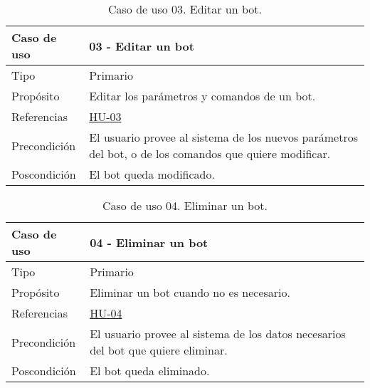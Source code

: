 \begin{table}[H]
    \centering
    \def\arraystretch{1.25}
    \begin{adjustbox}{max width=\textwidth}
    \begin{tabularx}{\textwidth}{|l|L|}
    \hline
        \textbf{Caso de uso} & \textbf{03 - Editar un bot} \\ \hline
    \hline
        Tipo & Primario \\ \hline
        Propósito & Editar los parámetros y comandos de un bot. \\ \hline
        Referencias & \hyperref[sec:hu03]{HU-03}\\ \hline
        Precondición & El usuario provee al sistema de los nuevos parámetros del bot, o de los comandos que quiere modificar. \\ \hline
        Poscondición & El bot queda modificado. \\ \hline
    \end{tabularx}
    \end{adjustbox}
    \caption{Caso de uso 03. Editar un bot.}
\end{table}

\begin{table}[H]
    \centering
    \def\arraystretch{1.25}
    \begin{adjustbox}{max width=\textwidth}
    \begin{tabularx}{\textwidth}{|l|L|}
    \hline
        \textbf{Caso de uso} & \textbf{04 - Eliminar un bot} \\ \hline
    \hline
        Tipo & Primario \\ \hline
        Propósito & Eliminar un bot cuando no es necesario. \\ \hline
        Referencias & \hyperref[sec:hu04]{HU-04} \\ \hline
        Precondición & El usuario provee al sistema de los datos necesarios del bot que quiere eliminar. \\ \hline
        Poscondición & El bot queda eliminado. \\ \hline
    \end{tabularx}
    \end{adjustbox}
    \caption{Caso de uso 04. Eliminar un bot.}
\end{table}

